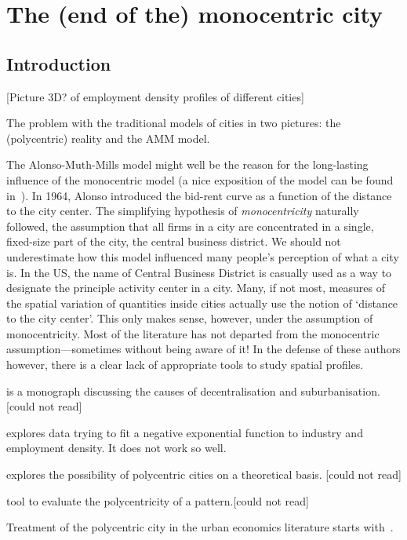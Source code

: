 %
\chapter{The (end of the) monocentric city}
\label{sec:related}


\section{Introduction}
\label{sec:introduction}

[Picture 3D? of employment density profiles of different cities]

The problem with the traditional models of cities in two pictures: the
(polycentric) reality and the AMM model.


The Alonso-Muth-Mills model might well be the reason for the long-lasting influence of
the monocentric model (a nice exposition of the model can be found
in~\cite{Fujita:1989}). In 1964, Alonso introduced the bid-rent curve as a
function of the distance to the city center. The simplifying hypothesis of
\emph{monocentricity} naturally followed, the assumption that all firms in a
city are concentrated in a single, fixed-size part of the city, the central business
district. We should not underestimate how this model influenced many people's
perception of what a city is. In the US, the name of Central Business District
is casually used as a way to designate the principle activity center in a city.
Many, if not most, measures of the spatial variation of quantities inside cities
actually use the notion of `distance to the city center'. This only makes sense,
however, under the assumption of monocentricity. Most of the
literature has not departed from the monocentric assumption---sometimes without
being aware of it! In the defense of these authors however, there is a clear
lack of appropriate tools to study spatial profiles.


\cite{Mills:1972} is a monograph discussing the causes of decentralisation and
suburbanisation. [could not read]

\cite{Kemper:1974} explores data trying to fit a negative exponential function
to industry and employment density. It does not work so well.

\cite{Odland:1978} explores the possibility of polycentric cities on a
theoretical basis. [could not read]

\cite{Griffith:1981} tool to evaluate the polycentricity of a pattern.[could not
read]

Treatment of the polycentric city in the urban economics literature starts
with~\cite{Fujita:1982}.

